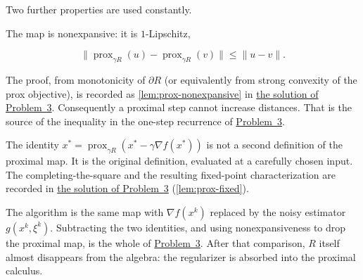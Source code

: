 \documentclass[11pt,a4paper]{article}
\DeclareMathOperator{\prox}{prox}
\newcommand{\jump}[2]{\hyperref[#1]{#2}}
\theoremstyle{definition}
\begin{document}
Two further properties are used constantly.

The map is nonexpansive: it is $1$-Lipschitz,

\[
\|\prox_{\gamma R}(u)-\prox_{\gamma R}(v)\|\le\|u-v\|.
\]

The proof, from monotonicity of $\partial R$ (or equivalently from strong convexity of the prox objective), is recorded as \cref{lem:prox-nonexpansive} in \jump{sol:spr2025-opt-3}{the solution of Problem~3}. Consequently a proximal step cannot increase distances. That is the source of the inequality in the one-step recurrence of \jump{prob:spr2025-opt-3}{Problem~3}.

The identity $x^*=\prox_{\gamma R}(x^*-\gamma\nabla f(x^*))$ is not a second definition of the proximal map. It is the original definition, evaluated at a carefully chosen input. The completing-the-square and the resulting fixed-point characterization are recorded in \jump{sol:spr2025-opt-3}{the solution of Problem~3} (\cref{lem:prox-fixed}).

The algorithm is the same map with $\nabla f(x^k)$ replaced by the noisy estimator $g(x^k,\xi^k)$. Subtracting the two identities, and using nonexpansiveness to drop the proximal map, is the whole of \jump{prob:spr2025-opt-3}{Problem~3}. After that comparison, $R$ itself almost disappears from the algebra: the regularizer is absorbed into the proximal calculus.
\end{document}
